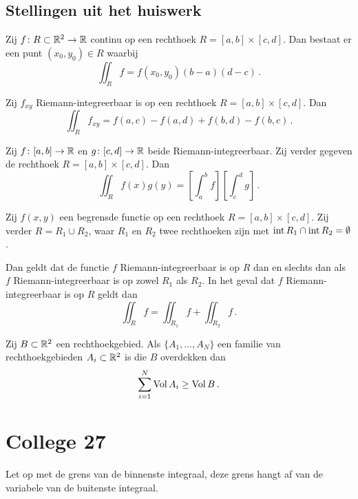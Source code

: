 \documentclass{2wa40summary}
\begin{document}
		\subsection{Stellingen uit het huiswerk}
		\begin{theorem}[\text{[K]} 11.1.10]
			Zij $f\colon R \subset \mathbb{R}^2 \to \mathbb{R}$ continu op een rechthoek $R = [a, b] \times [c, d]$.
			Dan bestaat er een punt $(x_0, y_0) \in R$ waarbij
			\[
			\iint_R f = f(x_0, y_0) (b - a) (d - c)\,.
			\]
		\end{theorem}
		\begin{theorem}[\text{[K] 11.2.6a}]
			Zij $f_{xy}$ Riemann-integreerbaar is op een rechthoek $R = [a, b] \times [c, d]$. Dan
			\[ 
				\iint_R f_{xy} = f(a, c) - f(a, d) + f(b, d) - f(b, c)\,.
			 \]
		\end{theorem}
		\begin{theorem}[\text{[K] 11.2.7a}]
			Zij $f\colon [a, b] \to \mathbb{R}$ en $g\colon [c, d] \to \mathbb{R}$ beide Riemann-integreerbaar. Zij verder gegeven de rechthoek $R = [a, b] \times [c, d]$. Dan
			\[ 
				\iint_R f(x) g(y) = \left[ \int_a^b f \right] \left[ \int_c^d g \right]\,.
			 \]
		\end{theorem}
		\begin{theorem}
			Zij $f(x, y)$ een begrensde functie op een rechthoek $R = [a, b] \times [c, d]$. Zij verder $R = R_1 \cup R_2$, waar $R_1$ en $R_2$ twee rechthoeken zijn met $\operatorname{\mathop{int}} R_1 \cap \operatorname{\mathop{int}} R_2 = \emptyset$.
			
			Dan geldt dat de functie $f$ Riemann-integreerbaar is op $R$ dan en slechts dan als $f$ Riemann-integreerbaar is op zowel $R_1$ als $R_2$. In het geval dat $f$ Riemann-integreerbaar is op $R$ geldt dan
			\[
			\iint_R f = \iint_{R_1} f + \iint_{R_2} f \,.
			\]
		\end{theorem}
		\begin{theorem}
			Zij $B \subset \mathbb{R}^2$ een rechthoekgebied. Als $\{ A_1, \dots, A_N \}$ een familie van rechthoekgebieden $A_i \subset \mathbb{R}^2$ is die $B$ overdekken dan
			\[
			\sum_{i=1}^N \operatorname{Vol} A_i \ge \operatorname{Vol} B \,.
			\]
		\end{theorem}
			
	\newpage
	\section{College 27}
		\begin{valkuil}
			Let op met de grens van de binnenste integraal, deze grens hangt af van de variabele van de buitenste integraal.
		\end{valkuil}
		
\end{document}
